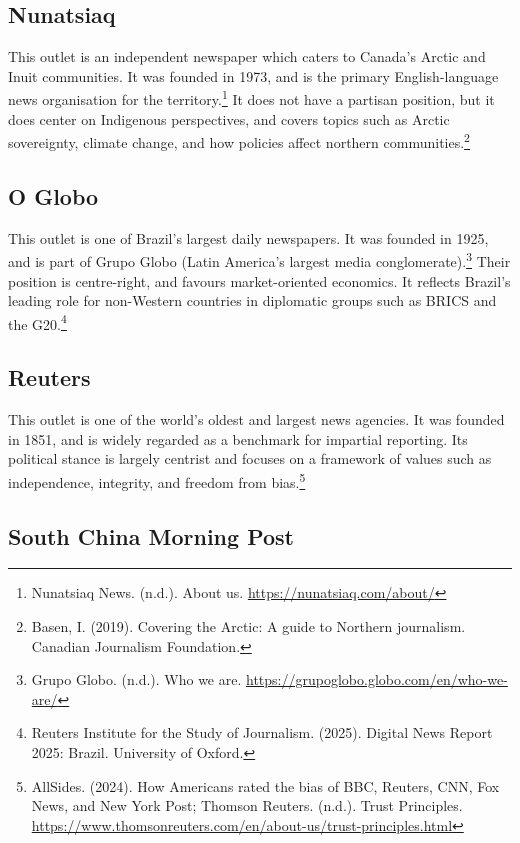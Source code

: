 \subsection{Nunatsiaq}

This outlet is an independent newspaper which caters to Canada's Arctic and Inuit communities. It was founded in 1973, and is the primary English-language news organisation for the territory.\footnote{Nunatsiaq News. (n.d.). About us. \url{https://nunatsiaq.com/about/}} It does not have a partisan position, but it does center on Indigenous perspectives, and covers topics such as Arctic sovereignty, climate change, and how policies affect northern communities.\footnote{Basen, I. (2019). Covering the Arctic: A guide to Northern journalism. Canadian Journalism Foundation.}

\subsection{O Globo}

This outlet is one of Brazil’s largest daily newspapers. It was founded in 1925, and is part of Grupo Globo (Latin America’s largest media conglomerate).\footnote{Grupo Globo. (n.d.). Who we are. \url{https://grupoglobo.globo.com/en/who-we-are/}} Their position is centre-right, and favours market-oriented economics. It reflects Brazil’s leading role for non-Western countries in diplomatic groups such as BRICS and the G20.\footnote{Reuters Institute for the Study of Journalism. (2025). Digital News Report 2025: Brazil. University of Oxford.}

\subsection{Reuters}

This outlet is one of the world’s oldest and largest news agencies. It was founded in 1851, and is widely regarded as a benchmark for impartial reporting. Its political stance is largely centrist and focuses on a framework of values such as independence, integrity, and freedom from bias.\footnote{AllSides. (2024). How Americans rated the bias of BBC, Reuters, CNN, Fox News, and New York Post; Thomson Reuters. (n.d.). Trust Principles. \url{https://www.thomsonreuters.com/en/about-us/trust-principles.html}}

\subsection{South China Morning Post}


